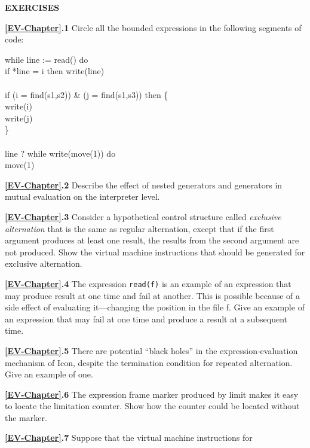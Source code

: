 \bigskip

\noindent\textbf{EXERCISES}

\textbf{\ref*{EV-Chapter}.1}
Circle all the bounded expressions in the following segments of code:

\begin{iconcode}
\>while line := read() do\\
\>\>if *line = i then write(line)\\
\\
\>if (i = find(s1,s2)) \& (j = find(s1,s3)) then \{\\
\>\>write(i)\\
\>\>write(j)\\
\>\>\}\\
\\
\>line ? while write(move(1)) do\\
\>\>\>move(1)
\end{iconcode}

\textbf{\ref*{EV-Chapter}.2}
Describe the effect of nested generators and generators in mutual
evaluation on the interpreter level.

\textbf{\ref*{EV-Chapter}.3}
Consider a hypothetical control structure called
\textit{exclusive alternation} that is the same as regular
alternation, except that if the first argument produces at least one
result, the results from the second argument are not produced. Show
the virtual machine instructions that should be generated for
exclusive alternation.

\textbf{\ref*{EV-Chapter}.4}
The expression \texttt{read(f)} is an example of an expression
that may produce result at one time and fail at another. This is
possible because of a side effect of evaluating it{---}changing the
position in the file f. Give an example of an expression that may fail
at one time and produce a result at a subsequent time.

\textbf{\ref*{EV-Chapter}.5}
There are potential ``black holes'' in
the expression-evaluation mechanism of Icon, despite the termination
condition for repeated alternation. Give an example of one.

\textbf{\ref*{EV-Chapter}.6}
The expression frame marker produced by limit makes it easy to
locate the limitation counter. Show how the counter could be located
without the marker.

\textbf{\ref*{EV-Chapter}.7}
Suppose that the virtual machine instructions for


